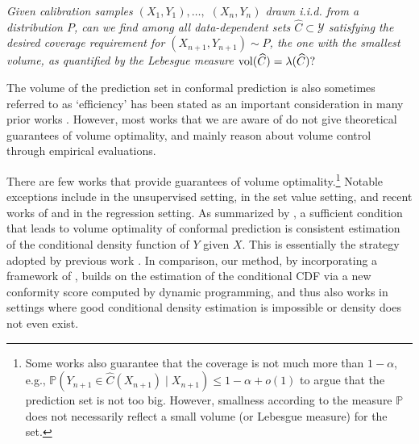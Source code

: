 \vspace{-15pt}
 {\em Given calibration samples $(X_1, Y_1),\dots,$ $(X_n, Y_n)$ drawn i.i.d. from a distribution $P$, can we find among all data-dependent sets $\widehat{C} \subset \mathcal{Y}$ satisfying the desired coverage requirement for $(X_{n+1}, Y_{n+1}) \sim P$, the one with the smallest volume, as quantified by the Lebesgue measure
$\mathrm{vol}(\widehat{C})=\lambda(\widehat{C})?$}

The volume of the prediction set in conformal prediction is also sometimes referred to as `efficiency' has been stated as an important consideration in many prior works \citep[see e.g.,][]{shafer2008tutorial, angelopoulos2023survey}. However, most works that we are aware of do not give theoretical guarantees of volume optimality, and mainly reason about volume control through empirical evaluations.

There are few works that provide guarantees of volume optimality.\footnote{Some works also guarantee that the coverage is not much more than $1-\alpha$, e.g., $\mathbb{P}\left(Y_{n+1}\in \widehat{C}(X_{n+1}) \mid X_{n+1}\right) \le  1-\alpha + o(1)$ to argue that the prediction set is not too big. However, smallness according to the measure $\mathbb{P}$ does not necessarily reflect a small volume (or Lebesgue measure) for the set. %
} Notable exceptions include \citet{Lei2013DistributionFreePS} in the unsupervised setting,  \citet{Sadinle2016LeastAS} in the set value setting, and recent works of \citet*{izbicki2020flexible,izbicki2022cd} and \citet{kiyani2024length} in the regression setting. As summarized by \cite{angelopoulos2024theoretical}, a sufficient condition that leads to volume optimality of conformal prediction is consistent estimation of the conditional density function of $Y$ given $X$. This is essentially the strategy adopted by previous work \citep{Lei2013DistributionFreePS,izbicki2020flexible,izbicki2022cd}. In comparison, our method, by incorporating a framework of \cite{chernozhukov2021distributional}, builds on the estimation of the conditional CDF via a new conformity score computed by dynamic programming, and thus also works in settings where good conditional density estimation is impossible or density does not even exist.


